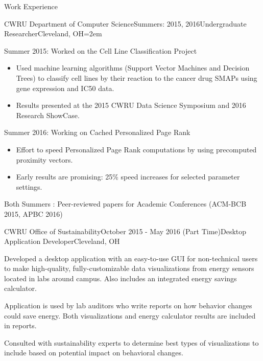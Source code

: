 \documentclass{resume} %
\begin{document}

\begin{rSection}{Work Experience}

\begin{rSubsection}{CWRU Department of Computer Science}{Summers: 2015, 2016}{Undergraduate Researcher}{Cleveland, OH}{\leftmargin=2em}


\item Summer 2015: Worked on the Cell Line Classification Project
{\renewcommand\labelitemi{$\cdot$}\vspace{-0.5em}
\begin{itemize}
\item Used machine learning algorithms (Support Vector Machines and Decision Trees) to classify cell lines by their reaction to the cancer drug SMAPs using gene expression and IC50 data.
\vspace{-0.5em}  
\item Results presented at the 2015 CWRU Data Science Symposium and 2016 Research ShowCase.
\end{itemize}
}
\item Summer 2016: Working on Cached Personalized Page Rank
{\renewcommand\labelitemi{$\cdot$}\vspace{-0.5em}
\begin{itemize}
\item Effort to speed Personalized Page Rank computations by using precomputed proximity vectors.
\vspace{-0.5em}  
\item Early results are promising: 25\% speed increases for selected parameter settings.
\end{itemize}
}
\item Both Summers : Peer-reviewed papers for Academic Conferences (ACM-BCB 2015, APBC 2016)
\end{rSubsection}


\begin{rSubsection}{CWRU Office of Sustainability}{October 2015 - May 2016 (Part Time)}{Desktop Application Developer}{Cleveland, OH}
\item Developed a desktop application with an easy-to-use GUI for non-technical users to make high-quality, fully-customizable data visualizations from energy sensors located in labs around campus. Also includes an integrated energy savings calculator.
\item Application is used by lab auditors who write reports on how behavior changes could save energy. Both visualizations and energy calculator results are included in reports.
\item Consulted with sustainability experts to determine best types of visualizations to include based on potential impact on behavioral changes.
\end{rSubsection}


\end{rSection}
\end{document}
